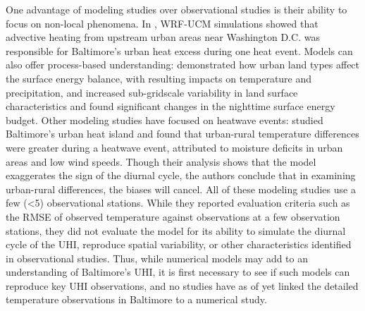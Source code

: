 One advantage of 
modeling studies over observational studies is their ability to focus on non-local phenomena.
In
\cite{zhang2011impact}, WRF-UCM simulations showed that advective heating from upstream urban areas near Washington D.C. was responsible for Baltimore's urban heat excess during one heat event. 
Models can also offer process-based understanding: \cite{li2013modeling} demonstrated how urban land types affect the surface energy balance, with resulting impacts on temperature and precipitation, and \cite{li2013development} increased sub-gridscale variability in land surface characteristics and found significant changes in the nighttime surface energy budget. 
Other modeling studies have focused on heatwave events: \cite{li2013synergistic} studied Baltimore's urban heat island and found that urban-rural temperature differences were greater during a heatwave event, attributed to moisture deficits in urban areas and low wind speeds. 
Though their analysis shows that the model exaggerates the sign of the diurnal cycle, the authors conclude that in examining urban-rural differences, the biases will cancel.%
All of these modeling studies use a few (<5) observational stations. While they reported evaluation criteria such as the RMSE of observed temperature against observations at a few observation stations, they did not evaluate the model for its ability to simulate the diurnal cycle of the UHI, reproduce spatial variability, or other characteristics identified in observational studies. Thus, while numerical models may add to an understanding of Baltimore's UHI, it is first necessary to see if such models can reproduce key UHI observations, and no studies have as of yet linked the detailed temperature observations in Baltimore to a numerical study. 



